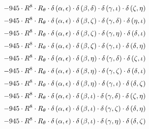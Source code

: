 \begin{subequations}
\begin{gather}
 \\[0.2em] \notag 		 - 945 \cdot R^{8} \cdot R_{\theta{}} \cdot \delta{}\left(\alpha{}, \epsilon{}\right) \cdot \delta{}\left(\beta{}, \delta{}\right) \cdot \delta{}\left(\gamma{}, \iota{}\right) \cdot \delta{}\left(\zeta{}, \eta{}\right) 
 \\[0.2em] \notag 		 - 945 \cdot R^{8} \cdot R_{\theta{}} \cdot \delta{}\left(\alpha{}, \epsilon{}\right) \cdot \delta{}\left(\beta{}, \zeta{}\right) \cdot \delta{}\left(\gamma{}, \delta{}\right) \cdot \delta{}\left(\eta{}, \iota{}\right) 
 \\[0.2em] \notag 		 - 945 \cdot R^{8} \cdot R_{\theta{}} \cdot \delta{}\left(\alpha{}, \epsilon{}\right) \cdot \delta{}\left(\beta{}, \zeta{}\right) \cdot \delta{}\left(\gamma{}, \eta{}\right) \cdot \delta{}\left(\delta{}, \iota{}\right) 
 \\[0.2em] \notag 		 - 945 \cdot R^{8} \cdot R_{\theta{}} \cdot \delta{}\left(\alpha{}, \epsilon{}\right) \cdot \delta{}\left(\beta{}, \zeta{}\right) \cdot \delta{}\left(\gamma{}, \iota{}\right) \cdot \delta{}\left(\delta{}, \eta{}\right) 
 \\[0.2em] \notag 		 - 945 \cdot R^{8} \cdot R_{\theta{}} \cdot \delta{}\left(\alpha{}, \epsilon{}\right) \cdot \delta{}\left(\beta{}, \eta{}\right) \cdot \delta{}\left(\gamma{}, \delta{}\right) \cdot \delta{}\left(\zeta{}, \iota{}\right) 
 \\[0.2em] \notag 		 - 945 \cdot R^{8} \cdot R_{\theta{}} \cdot \delta{}\left(\alpha{}, \epsilon{}\right) \cdot \delta{}\left(\beta{}, \eta{}\right) \cdot \delta{}\left(\gamma{}, \zeta{}\right) \cdot \delta{}\left(\delta{}, \iota{}\right) 
 \\[0.2em] \notag 		 - 945 \cdot R^{8} \cdot R_{\theta{}} \cdot \delta{}\left(\alpha{}, \epsilon{}\right) \cdot \delta{}\left(\beta{}, \eta{}\right) \cdot \delta{}\left(\gamma{}, \iota{}\right) \cdot \delta{}\left(\delta{}, \zeta{}\right) 
 \\[0.2em] \notag 		 - 945 \cdot R^{8} \cdot R_{\theta{}} \cdot \delta{}\left(\alpha{}, \epsilon{}\right) \cdot \delta{}\left(\beta{}, \iota{}\right) \cdot \delta{}\left(\gamma{}, \delta{}\right) \cdot \delta{}\left(\zeta{}, \eta{}\right) 
 \\[0.2em] \notag 		 - 945 \cdot R^{8} \cdot R_{\theta{}} \cdot \delta{}\left(\alpha{}, \epsilon{}\right) \cdot \delta{}\left(\beta{}, \iota{}\right) \cdot \delta{}\left(\gamma{}, \zeta{}\right) \cdot \delta{}\left(\delta{}, \eta{}\right) 
 \\[0.2em] \notag 		 - 945 \cdot R^{8} \cdot R_{\theta{}} \cdot \delta{}\left(\alpha{}, \epsilon{}\right) \cdot \delta{}\left(\beta{}, \iota{}\right) \cdot \delta{}\left(\gamma{}, \eta{}\right) \cdot \delta{}\left(\delta{}, \zeta{}\right) 

\end{gather}
\end{subequations}
